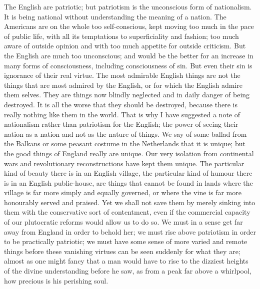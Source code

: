 \documentclass{book}
\begin{document}
The English are patriotic; but patriotism is the unconscious form of nationalism. It is being national without understanding the meaning of a nation. The Americans are on the whole too self-conscious, kept moving too much in the pace of public life, with all its temptations to superficiality and fashion; too much aware of outside opinion and with too much appetite for outside criticism. But the English are much too unconscious; and would be the better for an increase in many forms of consciousness, including consciousness of sin. But even their sin is ignorance of their real virtue. The most admirable English things are not the things that are most admired by the English, or for which the English admire them selves. They are things now blindly neglected and in daily danger of being destroyed. It is all the worse that they should be destroyed, because there is really nothing like them in the world. That is why I have suggested a note of nationalism rather than patriotism for the English; the power of seeing their nation as a nation and not as the nature of things. We say of some ballad from the Balkans or some peasant costume in the Netherlands that it is unique; but the good things of England really are unique. Our very isolation from continental wars and revolutionary reconstructions have kept them unique. The particular kind of beauty there is in an English village, the particular kind of humour there is in an English public-house, are things that cannot be found in lands where the village is far more simply and equally governed, or where the vine is far more honourably served and praised. Yet we shall not save them by merely sinking into them with the conservative sort of contentment, even if the commercial capacity of our plutocratic reforms would allow us to do so. We must in a sense get far away from England in order to behold her; we must rise above patriotism in order to be practically patriotic; we must have some sense of more varied and remote things before these vanishing virtues can be seen suddenly for what they are; almost as one might fancy that a man would have to rise to the dizziest heights of the divine understanding before he saw, as from a peak far above a whirlpool, how precious is his perishing soul.
\end{document}
